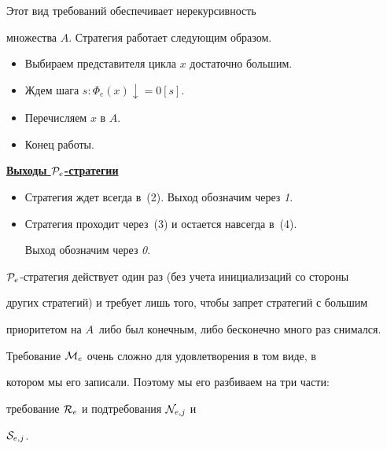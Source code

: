 \noindent Этот вид требований обеспечивает нерекурсивность


множества $A$. Стратегия работает следующим образом.


\begin{itemize}


\item[(1)] Выбираем представителя цикла $x$ достаточно большим.


\item[(2)] Ждем шага $s: \Phi_e(x)\downarrow=0  [s]$.


\item[(3)] Перечисляем $x$ в $A$.


\item[(4)] Конец работы.


\end{itemize}





\underline{\bf Выходы ${\cal P}_e$-стратегии}





\begin{itemize}


\item[1)] Стратегия ждет всегда в~(2). Выход обозначим через {\it 1}.


\item[2)] Стратегия проходит через~(3) и остается навсегда в~(4).


Выход обозначим через {\it 0}.


\end{itemize}





${\cal P}_e$-стратегия действует один раз (без учета инициализаций со стороны


других стратегий) и требует лишь того, чтобы запрет стратегий с большим


приоритетом на $A$\, либо был конечным, либо бесконечно много раз снимался.





Требование ${\cal M}_e$ очень сложно для удовлетворения в том виде, в


котором мы его записали. Поэтому мы его разбиваем на три части:


требование ${\cal R}_e$ и подтребования ${\cal N}_{e,j}$ и


${\cal S}_{e,j}$.


